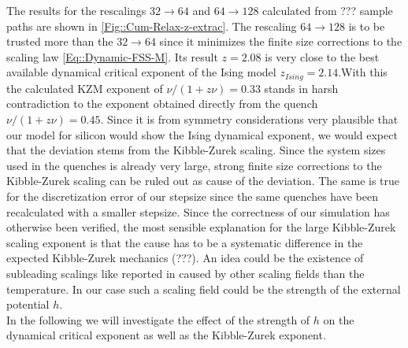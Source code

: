 	The results for the rescalings $32 \rightarrow 64$ and $64 \rightarrow 128$ calculated from ??? sample paths are shown in \autoref{Fig::Cum-Relax-z-extrac}. The rescaling $64 \rightarrow 128$ is to be trusted more than the $32 \rightarrow 64$ since it minimizes the finite size corrections to the scaling law \autoref{Eq::Dynamic-FSS-M}. Its result $z =	2.08$ is very close to the best available dynamical critical exponent of the Ising model $z_{Ising}=2.14$.With this the calculated KZM exponent of $\nu /	(1 + z\nu) = 0.33	$ stands in harsh contradiction to the exponent obtained directly from the quench $\nu /	(1 + z\nu) = 0.45$. Since it is from symmetry considerations very plausible that our model for silicon would show the Ising dynamical exponent, we would expect that the deviation stems from the Kibble-Zurek scaling. Since the system sizes used in the quenches is already very large, strong finite size corrections to the Kibble-Zurek scaling can be ruled out as cause of the deviation. The same is true for the discretization error of our stepsize since the same quenches have been recalculated with a smaller stepsize. Since the correctness of our simulation has otherwise been verified, the most sensible explanation for the large Kibble-Zurek scaling exponent is that the cause has to be a systematic difference in the expected Kibble-Zurek mechanics (???). An idea could be the existence of subleading scalings like reported in \cite{ladewig2020kibble} caused by other scaling fields than the temperature. In our case such a scaling field could be the strength of the external potential $h$. \\
	
	In the following we will investigate the effect of the strength of $h$ on the dynamical critical exponent as well as the Kibble-Zurek exponent.
